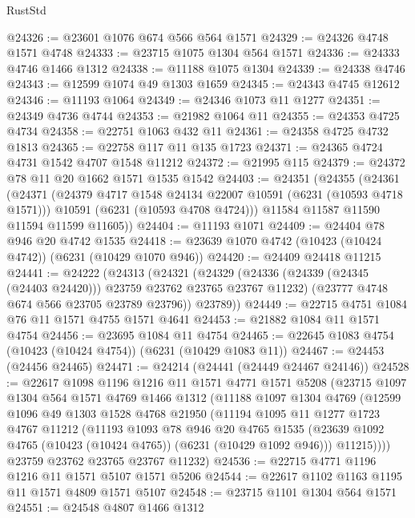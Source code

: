 \begin{lexlean}{RustStd}
\begin{coremodule}
{{@24326 := @23601 @1076 @674 @566 @564 @1571
@24329 := @24326 @4748 @1571 @4748
@24333 := @23715 @1075 @1304 @564 @1571
@24336 := @24333 @4746 @1466 @1312
@24338 := @11188 @1075 @1304
@24339 := @24338 @4746
@24343 := @12599 @1074 @49 @1303 @1659
@24345 := @24343 @4745 @12612
@24346 := @11193 @1064
@24349 := @24346 @1073 @11 @1277
@24351 := @24349 @4736 @4744
@24353 := @21982 @1064 @11
@24355 := @24353 @4725 @4734
@24358 := @22751 @1063 @432 @11
@24361 := @24358 @4725 @4732 @1813
@24365 := @22758 @117 @11 @135 @1723
@24371 := @24365 @4724 @4731 @1542 @4707 @1548 @11212
@24372 := @21995 @115
@24379 := @24372 @78 @11 @20 @1662 @1571 @1535 @1542
@24403 := @24351
    (@24355
      (@24361
        (@24371
          (@24379 @4717 @1548 @24134 @22007 @10591 (@6231 (@10593 @4718 @1571)))
          @10591
          (@6231 (@10593 @4708 @4724)))
        @11584
        @11587
        @11590
        @11594
        @11599
        @11605))
@24404 := @11193 @1071
@24409 := @24404 @78 @946 @20 @4742 @1535
@24418 := @23639 @1070 @4742 (@10423 (@10424 @4742)) (@6231 (@10429 @1070 @946))
@24420 := @24409 @24418 @11215
@24441 := @24222
    (@24313
      (@24321
        (@24329
          (@24336 (@24339 (@24345 (@24403 @24420))) @23759 @23762 @23765 @23767 @11232)
          (@23777 @4748 @674 @566 @23705 @23789 @23796))
        @23789))
@24449 := @22715 @4751 @1084 @76 @11 @1571 @4755 @1571 @4641
@24453 := @21882 @1084 @11 @1571 @4754
@24456 := @23695 @1084 @11 @4754
@24465 := @22645 @1083 @4754 (@10423 (@10424 @4754)) (@6231 (@10429 @1083 @11))
@24467 := @24453 (@24456 @24465)
@24471 := @24214 (@24441 (@24449 @24467 @24146))
@24528 := @22617
    @1098
    @1196
    @1216
    @11
    @1571
    @4771
    @1571
    @5208
    (@23715
      @1097
      @1304
      @564
      @1571
      @4769
      @1466
      @1312
      (@11188
        @1097
        @1304
        @4769
        (@12599
          @1096
          @49
          @1303
          @1528
          @4768
          @21950
          (@11194
            @1095
            @11
            @1277
            @1723
            @4767
            @11212
            (@11193
              @1093
              @78
              @946
              @20
              @4765
              @1535
              (@23639 @1092 @4765 (@10423 (@10424 @4765)) (@6231 (@10429 @1092 @946)))
              @11215))))
      @23759
      @23762
      @23765
      @23767
      @11232)
@24536 := @22715 @4771 @1196 @1216 @11 @1571 @5107 @1571 @5206
@24544 := @22617 @1102 @1163 @1195 @11 @1571 @4809 @1571 @5107
@24548 := @23715 @1101 @1304 @564 @1571
@24551 := @24548 @4807 @1466 @1312
}}
\end{coremodule}
\end{lexlean}
